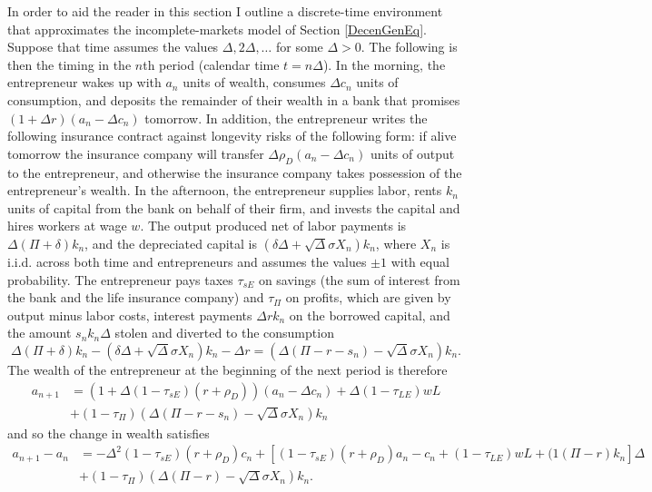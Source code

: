 \documentclass[11pt]{article}
\theoremstyle{plain}
\theoremstyle{definition} %
\begin{document}
In order to aid the reader in this section I outline a discrete-time environment that approximates the incomplete-markets model of Section \ref{DecenGenEq}. Suppose that time assumes the values $\Delta, 2\Delta, \dots$ for some $\Delta >0$. The following is then the timing in the $n$th period (calendar time $t = n\Delta$). In the morning, the entrepreneur wakes up with $a_n$ units of wealth, consumes $\Delta c_n$ units of consumption, and deposits the remainder of their wealth in a bank that promises $(1+\Delta r)(a_n - \Delta c_n)$ tomorrow. In addition, the entrepreneur writes the following insurance contract against longevity risks of the following form: if alive tomorrow the insurance company will transfer $\Delta\rho_D(a_n - \Delta c_n)$ units of output to the entrepreneur, and otherwise the insurance company takes possession of the entrepreneur's wealth. In the afternoon, the entrepreneur supplies labor, rents $k_n$ units of capital from the bank on behalf of their firm, and invests the capital and hires workers at wage $w$. The output produced net of labor payments is $\Delta (\Pi + \delta) k_n$, and the depreciated capital is $(\delta \Delta + \sqrt{\Delta}\sigma X_n)k_n$, where $X_n$ is i.i.d. across both time and entrepreneurs and assumes the values $\pm 1$ with equal probability. The entrepreneur pays taxes $\tau_{sE}$ on savings (the sum of interest from the bank and the life insurance company) and $\tau_{\Pi}$ on profits, which are given by output minus labor costs, interest payments $\Delta rk_n$ on the borrowed capital, and the amount $s_nk_n\Delta$ stolen and diverted to the consumption
$$
\Delta (\Pi + \delta) k_n - (\delta \Delta + \sqrt{\Delta}\sigma X_n)k_n - \Delta r = {\left(\Delta (\Pi - r - s_n) - \sqrt{\Delta}\sigma X_n\right)} k_n.
$$
The wealth of the entrepreneur at the beginning of the next period is therefore
\begin{align*}
a_{n+1} & = (1+ \Delta (1-\tau_{sE}) (r+\rho_D)) (a_n - \Delta c_n) + \Delta (1-\tau_{LE})wL
\\ & + (1-\tau_{\Pi}){\left(\Delta (\Pi - r - s_n) - \sqrt{\Delta}\sigma X_n\right)} k_n
\end{align*}
and so the change in wealth satisfies
\begin{align*}
a_{n+1}-a_n & = -\Delta^2(1-\tau_{sE}) (r+\rho_D) c_n + {\left[ (1-\tau_{sE})(r+\rho_D)a_n - c_n + (1-\tau_{LE})wL + (1(\Pi - r)k_n\right]}\Delta 
\\ & + (1-\tau_{\Pi}){\left(\Delta (\Pi - r) - \sqrt{\Delta}\sigma X_n\right)} k_n.
\end{align*}
\end{document}
